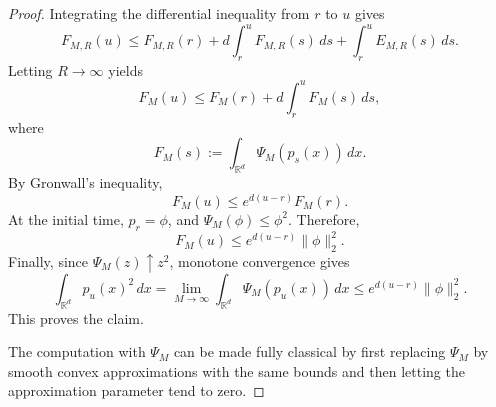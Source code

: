 \documentclass[10pt,a4paper]{amsart}
\def\to{\rightarrow}
\begin{document}
\begin{proof}
Integrating the differential inequality from $r$ to $u$ gives
\[
F_{M,R}(u)
\le
F_{M,R}(r)
+
d\int_r^u F_{M,R}(s)\,ds
+
\int_r^u E_{M,R}(s)\,ds.
\]
Letting $R\to\infty$ yields
\[
F_M(u)
\le
F_M(r)
+
d\int_r^u F_M(s)\,ds,
\]
where
\[
F_M(s):=\int_{\mathbb R^d}\Psi_M(p_s(x))\,dx.
\]
By Gronwall's inequality,
\[
F_M(u)\le e^{d(u-r)}F_M(r).
\]
At the initial time, $p_r=\phi$, and $\Psi_M(\phi)\le \phi^2$. Therefore,
\[
F_M(u)
\le
e^{d(u-r)}\|\phi\|_2^2.
\]
Finally, since $\Psi_M(z)\uparrow z^2$, monotone convergence gives
\[
\int_{\mathbb R^d}p_u(x)^2\,dx
=
\lim_{M\to\infty}
\int_{\mathbb R^d}\Psi_M(p_u(x))\,dx
\le
e^{d(u-r)}\|\phi\|_2^2.
\]
This proves the claim.

The computation with $\Psi_M$ can be made fully classical by first replacing
$\Psi_M$ by smooth convex approximations with the same bounds and then
letting the approximation parameter tend to zero.
\end{proof}
\end{document}
